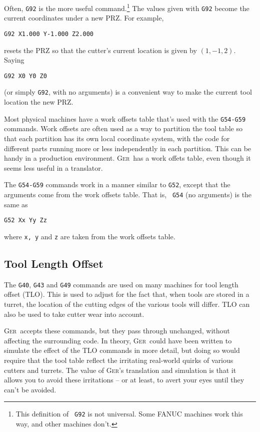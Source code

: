 \documentclass[titlepage,oneside,10pt]{article}
\newcommand{\ger}{\textsc{Ger}}
\begin{document}
Often, {\tt G92} is the more useful command.\footnote{This definition of {\tt
  G92} is not universal. Some FANUC machines work this way, and other
machines don't. }  The values given with 
{\tt G92} become the current coordinates under a new PRZ. For example, 
\begin{verbatim}
G92 X1.000 Y-1.000 Z2.000
\end{verbatim}
resets the PRZ so that the cutter's current location is given
by $(1,-1,2)$. Saying 
\begin{verbatim}
G92 X0 Y0 Z0
\end{verbatim}
(or simply {\tt G92}, with no arguments) is a convenient way to make
the current tool location the new PRZ.

Most physical machines have a work offsets table that's used with the
{\tt G54-G59} commands. Work offsets are often used as a way to
partition the tool table so that each partition has its own local
coordinate system, with the code for different parts running more or
less independently in each partition. This can be handy in a
production environment. \ger\ has a work offets table, even though it
seems less useful in a translator. 

The {\tt G54-G59} commands work in a manner similar to {\tt G52}, except
that the arguments come from the work offsets table. That is, {\tt
  G54} (no arguments) is the same as
\begin{verbatim}
G52 Xx Yy Zz
\end{verbatim}
where {\tt x, y} and {\tt z} are taken from the work offsets table. 

\subsection{Tool Length Offset}

The {\tt G40}, {\tt G43} and {\tt G49} commands are used on many
machines for tool length offset (TLO). This is used to adjust for the
fact that, when tools are stored in a turret, the location of the
cutting edges of the various tools will differ. TLO can also be used
to take cutter wear into account. 

\ger\ accepts these commands, but they pass through unchanged, without
affecting the surrounding code. In theory, \ger\ could have been
written to simulate the effect of the TLO commands in more detail, but
doing so would require that the tool table reflect the irritating
real-world quirks of various cutters and turrets. The value of \ger's
translation and simulation is that it allows you to avoid these
irritations -- or at least, to avert your eyes until they can't be avoided. 
\end{document}
